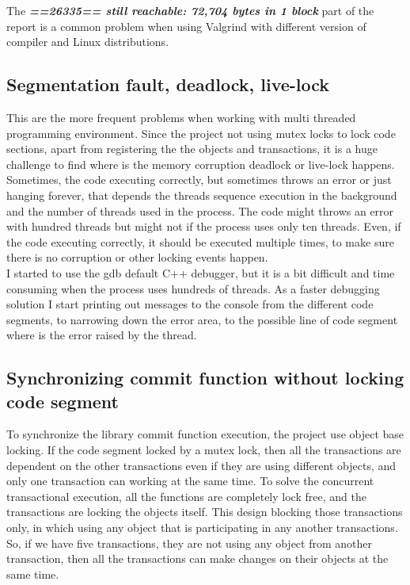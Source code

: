 \documentclass[12pt]{article}
\begin{document}
The \textbf{\textit{==26335==  still reachable: 72,704 bytes in 1 block}} part of the report is a common problem when using Valgrind with different version of compiler and Linux distributions. 

\subsection{Segmentation fault, deadlock, live-lock}
This are the more frequent problems when working with multi threaded programming environment. Since the project not using mutex locks to lock code sections, apart from registering the the objects and transactions, it is a huge challenge to find where is the memory corruption deadlock or live-lock happens. Sometimes, the code executing correctly, but sometimes throws an error or just hanging forever, that depends the threads sequence execution in the background and the number of threads used in the process. The code might throws an error with hundred threads but might not if the process uses only ten threads. Even, if the code executing correctly, it should be executed multiple times, to make sure there is no corruption or other locking events happen.\\

I started to use the gdb default C++ debugger, but it is a bit difficult and time consuming when the process uses hundreds of threads. As a faster debugging solution I start printing out messages to the console from the different code segments, to narrowing down the error area, to the possible line of code segment where is the error raised by the thread.    

\subsection{Synchronizing commit function without locking code segment }
To synchronize the library commit function execution, the project use object base locking. If the code segment locked by a mutex lock, then all the transactions are dependent on the other transactions even if they are using different objects, and only one transaction can working at the same time. To solve the concurrent transactional execution, all the functions are completely lock free, and the transactions are locking the objects itself. This design blocking those transactions only, in which using any object that is participating in any another transactions. So, if we have five transactions, they are not using any object from another transaction, then all the transactions can make changes on their objects at the same time. 
\end{document}
